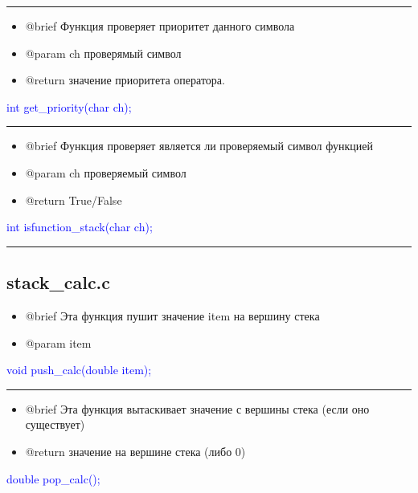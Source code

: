 \documentclass{article}
\begin{document}
{\color{red} \rule{\linewidth}{0.5mm}}

\begin{itemize}
\item @brief Функция проверяет приоритет данного символа

\item @param ch проверямый символ

\item @return значение приоритета оператора.
\end{itemize}

\textcolor{blue}{int get\_priority(char ch);}


{\color{red} \rule{\linewidth}{0.5mm}}

\begin{itemize}
\item @brief Функция проверяет является ли проверяемый символ функцией

\item @param ch проверяемый символ

\item @return True/False
\end{itemize}

\textcolor{blue}{int isfunction\_stack(char ch);}


{\color{red} \rule{\linewidth}{0.5mm}}



\subsection{\textbf{stack\_calc.c}}
\begin{itemize}
\item @brief Эта функция пушит значение item на вершину стека

\item @param item 
\end{itemize}

\textcolor{blue}{void push\_calc(double item);}


{\color{red} \rule{\linewidth}{0.5mm}}

\begin{itemize}
\item @brief Эта функция вытаскивает значение с вершины стека (если оно существует)

\item @return значение на вершине стека (либо 0)
\end{itemize}

\textcolor{blue}{double pop\_calc();}
\end{document}
